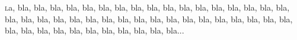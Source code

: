 \documentclass[10pt,a4paper]{article}
\newlength{\lrg}\newlength{\htr}\newlength{\prof}
\newcommand{\cadre}[1]{%
		\vspace{0.2cm}
		\lettrine[loversize=0.6,lraise=0.2,findent=0.5em,nindent=0em]{%
			\framebox[\lrg]{#1\rule[-2.5\prof]{0pt}{3.2\htr}}%
		}%
	}%
\begin{document}
\cadre{B}la, bla, bla, bla, bla, bla, bla, bla, bla, bla, bla, bla, bla, bla, bla,
bla, bla, bla, bla, bla, bla, bla, bla, bla, bla, bla, bla, bla, bla, bla, bla, bla,
bla, bla, bla, bla, bla, bla, bla, bla, bla, bla, bla, bla, bla, bla, bla...
\end{document}
